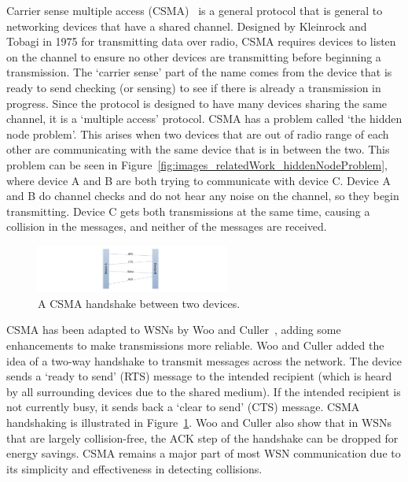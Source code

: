 Carrier sense multiple access (CSMA)~\cite{generalCSMA, generalCSMAPart2} is a general protocol that is general to networking 
devices that have a shared channel. 
Designed by Kleinrock and Tobagi in 1975 for transmitting data over radio, CSMA requires devices to listen on the channel
to ensure no other devices are transmitting before beginning a transmission. The `carrier sense' part of the name comes from 
the device that is ready to send checking (or sensing) to see if there is already a transmission in progress. 
Since the protocol is designed to have many devices sharing the same channel, it is a 
`multiple access' protocol. CSMA has a problem called `the hidden node problem'. This arises when two 
devices that are out of radio range of each other are communicating with the same device that is in 
between the two. This problem can be seen in Figure~\ref{fig:images_relatedWork_hiddenNodeProblem}, where device A and B 
are both trying to communicate with device C. Device A and B do channel checks and do not hear any noise on the channel,
so they begin transmitting. Device C gets both transmissions at the same time, causing a collision in the messages, and 
neither of the messages are received.



\begin{figure}[htb]
	\centering
		\includegraphics[width=2.5in]{images/relatedWork/CSMA.pdf}
	\caption{A CSMA handshake between two devices.}
	\label{fig:images_relatedWork_CSMA}
\end{figure}

CSMA has been adapted to WSNs by Woo and Culler~\cite{CSMA}, adding some enhancements to make 
transmissions more reliable. Woo and Culler added the idea of a two-way handshake to transmit 
messages across the network. The device sends a `ready to send' (RTS) message 
to the intended recipient (which is heard by all surrounding devices due to the shared medium). If the intended
recipient is not currently busy, it sends back a `clear to send' (CTS) message. CSMA handshaking is illustrated in  
Figure~\ref{fig:images_relatedWork_CSMA}. Woo and Culler also show that in WSNs that are largely collision-free, the ACK
step of the handshake can be dropped for energy savings. CSMA remains a major part of most WSN communication
due to its simplicity and effectiveness in detecting collisions.



